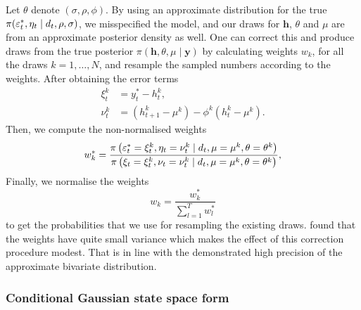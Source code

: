 Let $\theta$ denote $(\sigma,\rho,\phi)$.
By using an approximate distribution for the true $\pi(\varepsilon_t^\ast,\eta_t\mid d_t,\rho,\sigma)$, we misspecified the model, and our draws for $\bm{h}$, $\theta$ and $\mu$ are from an approximate posterior density as well.
One can correct this and produce draws from the true posterior $\pi(\bm{h},\theta,\mu\mid\bm{y})$ by calculating weights $w_k$, for all the draws $k=1,\dots,N$, and resample the sampled numbers according to the weights.
After obtaining the error terms
\begin{align*}
\xi_t^k &= y_t^\ast-h_t^k, \\
\nu_t^k &= (h_{t+1}^k-\mu^k)-\phi^k(h_t^k-\mu^k).
\end{align*}
Then, we compute the non-normalised weights
\begin{equation*}
w_k^\ast=\frac{\pi\left(\varepsilon_t^\ast=\xi_t^k,\eta_t=\nu_t^k\mid d_t,\mu=\mu^k,\theta=\theta^k\right)}{\pi\left(\xi_t=\xi_t^k,\nu_t=\nu_t^k\mid d_t,\mu=\mu^k,\theta=\theta^k\right)},
\end{equation*}
Finally, we normalise the weights
\begin{equation*}
w_k=\frac{w_k^\ast}{\sum_{l=1}^{T}w_l^\ast}
\end{equation*}
to get the probabilities that we use for resampling the existing draws.
\citet{Omori2007} found that the weights have quite small variance which makes the effect of this correction procedure modest.
That is in line with the demonstrated high precision of the approximate bivariate distribution.

\subsubsection[State space form]{Conditional Gaussian state space form}

